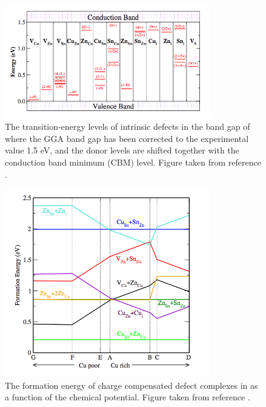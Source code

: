 \begin{figure}[h!]
  \centering
    \includegraphics[width=0.8\textwidth]{figures/Chen_pt_E-level.png}
    \caption{The transition-energy levels of intrinsic defects in the band gap of \CZTS where the GGA band gap has been corrected to the experimental value 1.5 eV, and the donor levels are shifted together with the conduction band minimum (CBM) level. Figure taken from reference .}
  \label{Chen_pt2}
\end{figure}

\begin{figure}[h!]
  \centering
    \includegraphics[width=0.8\textwidth]{figures/Chen_cluster_formE.png}
    \caption{The formation energy of charge compensated defect complexes in \CZTS as a function of the chemical potential. Figure taken from reference .}
  \label{Chen_cluster1}
\end{figure}

